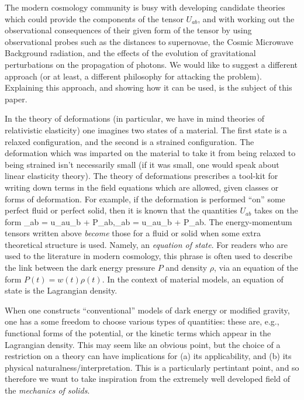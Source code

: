 The modern cosmology community is busy with developing candidate theories which could provide the components of the tensor $U_{ab}$, and with working out the observational consequences of their given form of the tensor by using observational probes such as the distances to supernovae, the Cosmic Microwave Background radiation, and the effects of the evolution of gravitational perturbations on the propagation of photons.  We would like to suggest a different approach (or at least, a different philosophy for attacking the problem). Explaining this approach, and showing how it can be used, is the subject of this paper.

In the theory of deformations (in particular, we have in mind   theories of relativistic elasticity) one imagines two states of a material. The first state is a relaxed configuration, and the second is a strained configuration. The deformation which was imparted on the material to take it from being relaxed to being strained isn't necessarily small (if it was small, one would  speak about linear elasticity theory). The theory of deformations prescribes a tool-kit for writing down terms in the field equations which are allowed, given classes or forms of deformation. For example, if the deformation is performed ``on'' some perfect fluid or perfect solid, then it is known that the quantities $U_{ab}$ takes on the form
\bea
{}_{ab} = \rho u_au_b + P\gamma_{ab},\qquad {}_{ab} = \rho u_au_b + P_{ab}.
\eea
The energy-momentum tensors written above \textit{become} those for a fluid or solid when some extra theoretical structure is used. Namely, an \textit{equation of state}. For readers who are used to the literature in modern cosmology, this phrase is often used to describe the link between the dark energy pressure $P$ and density $\rho$, via an equation of the form $P(t) = w(t) \rho(t)$. In the context of material models, an equation of state is the Lagrangian density.

When one constructs ``conventional'' models of dark energy or modified gravity, one has a some freedom to choose various types of quantities: these are, e.g., functional forms of the potential, or the kinetic terms which appear in the Lagrangian density. This may seem like an obvious point, but the choice of a restriction on a theory can have implications for (a) its applicability, and (b) its physical naturalness/interpretation. This is a particularly pertintant point, and so therefore we want to take inspiration from the extremely well developed field of the \textit{mechanics of solids}.


